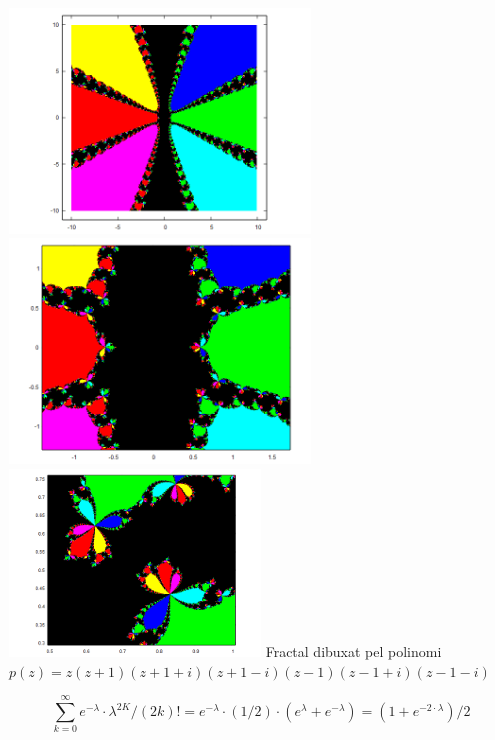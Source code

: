 \documentclass[12pt]{report}
\begin{document}
\begin{center}
    \includegraphics[width=0.6\textwidth]{z7.png}
    \newline
    \includegraphics[width=0.6\textwidth]{z7_zoom.png}
    \newline
    \includegraphics[width=0.5\textwidth]{z7_zoom2.png}
    \newline
\hspace{-6em}Fractal dibuxat pel polinomi $p(z)=z(z+1)(z+1+i)(z+1-i)(z-1)(z-1+i)(z-1-i) $
\label{fig:prodcte arrels}
\end{center}
\newpage


$$\sum_{k=0}^{\infty} e^{-\lambda} \cdot \lambda^{2K} / (2k)! = e^{-\lambda} \cdot (1/2) \cdot (e^{\lambda} + e^{-\lambda}) = (1+e^{-2 \cdot
\lambda})/2$$
\end{document}
